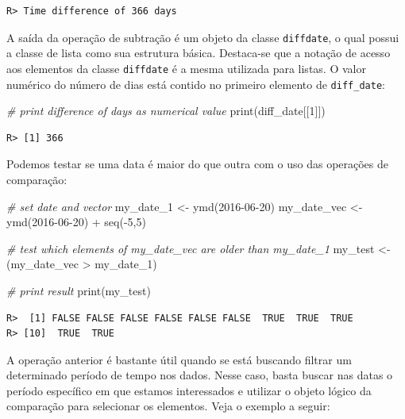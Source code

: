 \documentclass[
  11pt,
]{book}
\newenvironment{Shaded}{\begin{snugshade}}{\end{snugshade}}
\newcommand{\CommentTok}[1]{\textcolor[rgb]{0.37,0.37,0.37}{\textit{#1}}}
\newcommand{\DecValTok}[1]{\textcolor[rgb]{0.06,0.06,0.06}{#1}}
\newcommand{\FunctionTok}[1]{\textcolor[rgb]{0,0,0}{#1}}
\newcommand{\NormalTok}[1]{#1}
\newcommand{\OtherTok}[1]{\textcolor[rgb]{0.37,0.37,0.37}{#1}}
\newcommand{\SpecialCharTok}[1]{\textcolor[rgb]{0,0,0}{#1}}
\newcommand{\StringTok}[1]{\textcolor[rgb]{0.5,0.5,0.5}{#1}}
\begin{document}
\begin{verbatim}
R> Time difference of 366 days
\end{verbatim}

A saída da operação de subtração é um objeto da classe \texttt{diffdate}, o qual possui a classe de lista como sua estrutura básica. Destaca-se que a notação de acesso aos elementos da classe \texttt{diffdate} é a mesma utilizada para listas. O valor numérico do número de dias está contido no primeiro elemento de \texttt{diff\_date}:

\begin{Shaded}
\begin{Highlighting}[]
\CommentTok{\# print difference of days as numerical value}
\FunctionTok{print}\NormalTok{(diff\_date[[}\DecValTok{1}\NormalTok{]])}
\end{Highlighting}
\end{Shaded}

\begin{verbatim}
R> [1] 366
\end{verbatim}

Podemos testar se uma data é maior do que outra com o uso das operações de comparação:

\begin{Shaded}
\begin{Highlighting}[]
\CommentTok{\# set date and vector}
\NormalTok{my\_date\_1 }\OtherTok{\textless{}{-}} \FunctionTok{ymd}\NormalTok{(}\StringTok{\textquotesingle{}2016{-}06{-}20\textquotesingle{}}\NormalTok{)}
\NormalTok{my\_date\_vec }\OtherTok{\textless{}{-}} \FunctionTok{ymd}\NormalTok{(}\StringTok{\textquotesingle{}2016{-}06{-}20\textquotesingle{}}\NormalTok{) }\SpecialCharTok{+} \FunctionTok{seq}\NormalTok{(}\SpecialCharTok{{-}}\DecValTok{5}\NormalTok{,}\DecValTok{5}\NormalTok{)}

\CommentTok{\# test which elements of my\_date\_vec are older than my\_date\_1}
\NormalTok{my\_test }\OtherTok{\textless{}{-}}\NormalTok{ (my\_date\_vec }\SpecialCharTok{\textgreater{}}\NormalTok{ my\_date\_1)}

\CommentTok{\# print result}
\FunctionTok{print}\NormalTok{(my\_test)}
\end{Highlighting}
\end{Shaded}

\begin{verbatim}
R>  [1] FALSE FALSE FALSE FALSE FALSE FALSE  TRUE  TRUE  TRUE
R> [10]  TRUE  TRUE
\end{verbatim}

A operação anterior é bastante útil quando se está buscando filtrar um determinado período de tempo nos dados. Nesse caso, basta buscar nas datas o período específico em que estamos interessados e utilizar o objeto lógico da comparação para selecionar os elementos. Veja o exemplo a seguir:
\end{document}
